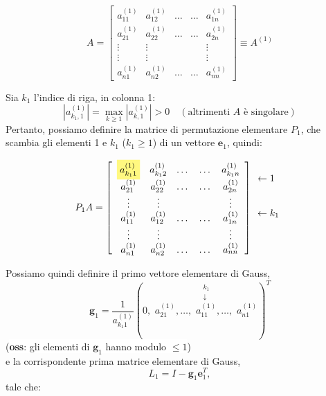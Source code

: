 \[
A = 
\begin{bmatrix}
a_{11}^{(1)} & a_{12}^{(1)} & \dots & \dots & a_{1n}^{(1)} \\
a_{21}^{(1)} & a_{22}^{(1)} & \dots & \dots & a_{2n}^{(1)} \\
\vdots & \vdots & & & \vdots \\
\vdots & \vdots & & & \vdots \\
a_{n1}^{(1)} & a_{n2}^{(1)} & \dots & \dots & a_{nn}^{(1)}
\end{bmatrix}
\equiv A^{(1)}
\]

Sia \colorbox{yellow!50}{$k_1$} l'indice di riga, in colonna 1:
\[
|a_{k_1, 1}^{(1)}| = \max_{k \ge 1} |a_{k, 1}^{(1)}| > 0 \quad (\text{altrimenti } A \text{ è singolare})
\]
Pertanto, possiamo definire la matrice di permutazione elementare $P_1$, che scambia gli elementi 1 e $k_1$ ($k_1 \ge 1$) di un vettore $\mathbf{e}_1$, quindi:

\[
P_1 A = 
\left[
\begin{array}{ccccc}
\colorbox{yellow!50}{$a_{k_1 1}^{(1)}$} & a_{k_1 2}^{(1)} & \dots & \dots & a_{k_1 n}^{(1)} \\
a_{21}^{(1)} & a_{22}^{(1)} & \dots & \dots & a_{2n}^{(1)} \\
\vdots & \vdots & & & \vdots \\
a_{11}^{(1)} & a_{12}^{(1)} & \dots & \dots & a_{1n}^{(1)} \\
\vdots & \vdots & & & \vdots \\
a_{n1}^{(1)} & a_{n2}^{(1)} & \dots & \dots & a_{nn}^{(1)}
\end{array}
\right]
\begin{array}{l}
\leftarrow 1 \\
\\
\\
\leftarrow k_1 \\
\\
\\
\end{array}
\]

Possiamo quindi definire il primo vettore elementare di Gauss,
\[
\mathbf{g}_1 = \frac{1}{a_{k_1 1}^{(1)}} (0, \,\, a_{21}^{(1)}, \dots, \,\, \overset{\substack{k_1 \\ \downarrow}}{a_{11}^{(1)}}, \dots, \,\, a_{n1}^{(1)})^T
\]
(\colorbox{white}{\textbf{oss}: gli elementi di $\mathbf{g}_1$ hanno modulo $\le 1$}) \\
e la corrispondente prima matrice elementare di Gauss,
\[
L_1 = I - \mathbf{g}_1 \mathbf{e}_1^T,
\]
tale che:

